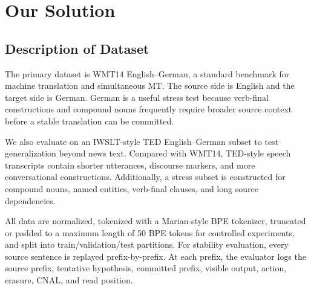 \documentclass[conference]{IEEEtran}
\begin{document}
\section{Our Solution}
\subsection{Description of Dataset}
The primary dataset is WMT14 English--German, a standard benchmark for machine translation and simultaneous MT. The source side is English and the target side is German. German is a useful stress test because verb-final constructions and compound nouns frequently require broader source context before a stable translation can be committed.

We also evaluate on an IWSLT-style TED English--German subset to test generalization beyond news text. Compared with WMT14, TED-style speech transcripts contain shorter utterances, discourse markers, and more conversational constructions. Additionally, a stress subset is constructed for compound nouns, named entities, verb-final clauses, and long source dependencies.

All data are normalized, tokenized with a Marian-style BPE tokenizer, truncated or padded to a maximum length of 50 BPE tokens for controlled experiments, and split into train/validation/test partitions. For stability evaluation, every source sentence is replayed prefix-by-prefix. At each prefix, the evaluator logs the source prefix, tentative hypothesis, committed prefix, visible output, action, erasure, CNAL, and read position.

\begin{table}[t]
\centering
\caption{Dataset summary used in final evaluation.}
\label{tab:datasets}
\end{table}
\end{document}
